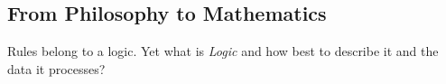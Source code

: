 %
%
%
%
%
%
%

\subsection{From Philosophy to Mathematics}
\label{from_philosophy_to_mathematics_heading}

Rules belong to a logic. Yet what is \emph{Logic} and how best to describe it
and the data it processes?




